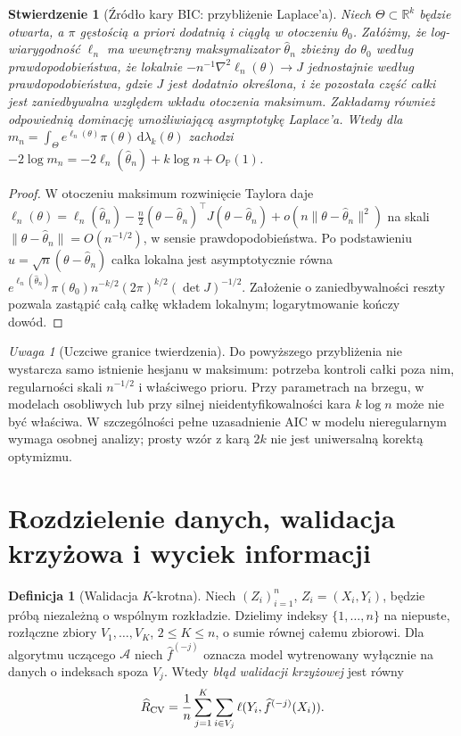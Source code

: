\documentclass[11pt,a4paper,oneside]{report}
\numberwithin{equation}{chapter}
\theoremstyle{plain}
\newtheorem{stwierdzenie}[twierdzenie]{Stwierdzenie}
\theoremstyle{definition}
\newtheorem{definicja}{Definicja}[chapter]
\theoremstyle{remark}
\newtheorem{uwaga}{Uwaga}[chapter]
\newcommand{\R}{\mathbb R}
\newcommand{\dd}{\mathrm d}
\begin{document}
\begin{stwierdzenie}[Źródło kary BIC: przybliżenie Laplace'a]
\label{prop:bic-laplace}
Niech $\Theta\subset\R^k$ będzie otwarta, a $\pi$
gęstością a priori dodatnią i ciągłą w otoczeniu
$\theta_0$. Załóżmy, że log-wiarygodność $\ell_n$
ma wewnętrzny maksymalizator $\widehat\theta_n$ zbieżny do
$\theta_0$ według prawdopodobieństwa, że lokalnie
$-n^{-1}\nabla^2\ell_n(\theta)\to J$ jednostajnie według
prawdopodobieństwa, gdzie $J$ jest dodatnio określona,
i że pozostała część całki jest zaniedbywalna względem
wkładu otoczenia maksimum. Zakładamy również
odpowiednią dominację umożliwiającą asymptotykę Laplace'a.
Wtedy dla $m_n=\int_\Theta e^{\ell_n(\theta)}\pi(\theta)
\,\dd\lambda_k(\theta)$ zachodzi
$-2\log m_n=-2\ell_n(\widehat\theta_n)+k\log n
+O_{\mathbb P}(1)$.
\end{stwierdzenie}
\begin{proof}
W otoczeniu maksimum rozwinięcie Taylora daje
$\ell_n(\theta)=\ell_n(\widehat\theta_n)-\tfrac n2
(\theta-\widehat\theta_n)^\top J
(\theta-\widehat\theta_n)+o(n\|\theta-\widehat\theta_n\|^2)$
na skali $\|\theta-\widehat\theta_n\|=O(n^{-1/2})$,
w sensie prawdopodobieństwa.
Po podstawieniu $u=\sqrt n(\theta-\widehat\theta_n)$
całka lokalna jest asymptotycznie równa
$e^{\ell_n(\widehat\theta_n)}\pi(\theta_0)n^{-k/2}
(2\pi)^{k/2}(\det J)^{-1/2}$.
Założenie o zaniedbywalności reszty pozwala zastąpić
całą całkę wkładem lokalnym; logarytmowanie kończy dowód.
\end{proof}

\begin{uwaga}[Uczciwe granice twierdzenia]
Do powyższego przybliżenia nie wystarcza samo istnienie
hesjanu w maksimum: potrzeba kontroli całki poza nim,
regularności skali $n^{-1/2}$ i właściwego prioru.
Przy parametrach na brzegu, w modelach osobliwych
lub przy silnej nieidentyfikowalności kara $k\log n$
może nie być właściwa. W szczególności pełne
uzasadnienie AIC w modelu nieregularnym wymaga
osobnej analizy; prosty wzór z karą $2k$ nie jest
uniwersalną korektą optymizmu.
\end{uwaga}

\section{Rozdzielenie danych, walidacja krzyżowa i wyciek informacji}
\begin{definicja}[Walidacja $K$-krotna]
Niech $(Z_i)_{i=1}^n$, $Z_i=(X_i,Y_i)$, będzie próbą
niezależną o wspólnym rozkładzie. Dzielimy indeksy
$\{1,\ldots,n\}$ na niepuste, rozłączne zbiory
$V_1,\ldots,V_K$, $2\le K\le n$, o sumie równej
całemu zbiorowi. Dla algorytmu uczącego $\mathcal A$
niech $\widehat f^{(-j)}$ oznacza model wytrenowany
wyłącznie na danych o indeksach spoza $V_j$.
Wtedy \emph{błąd walidacji krzyżowej} jest równy
\[
 \widehat R_{\rm CV}=
 \frac1n\sum_{j=1}^K\sum_{i\in V_j}
 \ell(Y_i,\widehat f^{(-j)}(X_i)).
\]
\end{definicja}
\end{document}
